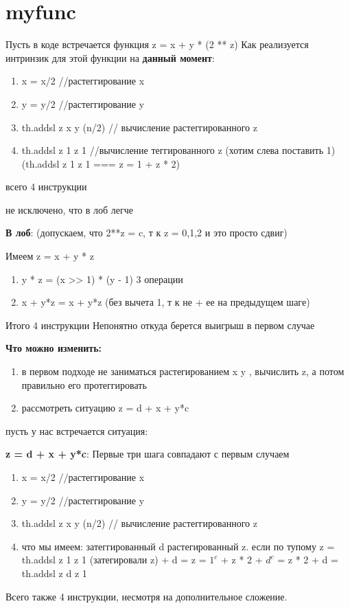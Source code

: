 \section{myfunc}
Пусть в коде встречается функция z = x + y * (2 ** z)
Как реализуется интринзик для этой функции на \textbf{данный момент}:
\begin{enumerate}
    \item x = x/2 //растеггирование x
    \item y = y/2 //растеггирование y
    \item th.addsl z x y (n/2) // вычисление растеггированного z
    \item th.addsl z 1 z 1 //вычисление теггированного z (хотим слева поставить 1) (th.addsl z 1 z 1 ===
    z = 1 + z * 2)
\end{enumerate}
всего 4 инструкции

не исключено, что в лоб легче

\textbf{В лоб}: (допускаем, что 2**z = c, т к z = 0,1,2 и это просто сдвиг)

Имеем z = x + y * z
\begin{enumerate}
    \item y * z = (x >> 1) * (y - 1) 3 операции
    \item x + y*z = x + y*z (без вычета 1, т к не + ее на предыдущем шаге)
\end{enumerate}
Итого 4 инструкции
Непонятно откуда берется выигрыш в первом случае

\textbf{Что можно изменить:}
\begin{enumerate}
    \item в первом подходе не заниматься растегированием x y
    , вычислить z, а потом правильно его протеггировать
    \item рассмотреть ситуацию z = d + x + y*c
\end{enumerate}

пусть у нас встречается ситуация:

\textbf{z = d + x + y*c}:
Первые три шага совпадают с первым случаем
\begin{enumerate}
    \item x = x/2 //растеггирование x
    \item y = y/2 //растеггирование y
    \item th.addsl z x y (n/2) // вычисление растеггированного z
    \item что мы имеем: затеггированный d
    растегированный z.
    если по тупому
    z = th.addsl z 1 z 1 (затегировали z) + d =
    z = $1^c$ + z * 2 + $d^c$ = z * 2 + d = th.addsl z d z 1
\end{enumerate}
Всего также 4 инструкции, несмотря на дополнительное сложение.
